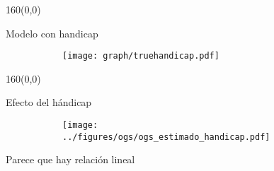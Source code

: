 \documentclass[shownotes,aspectratio=169]{beamer}
\begin{document}
\begin{frame}[plain]
\begin{textblock}{160}(0,0)
\begin{center}
 \Large Modelo con handicap
\end{center}
\end{textblock}

 \begin{figure}[H]     
     \centering
     \begin{subfigure}[b]{0.75\textwidth}
       \texttt{[image: graph/truehandicap.pdf]} 
     \end{subfigure}
   \end{figure} 
  
\end{frame}


% 
% 


\begin{frame}[plain]
\begin{textblock}{160}(0,0)
\begin{center}
 \Large Efecto del h\'andicap
\end{center}
\end{textblock}

   \begin{figure}[H]     
     \centering
     \begin{subfigure}[b]{0.75\textwidth}
       \texttt{[image: ../figures/ogs/ogs\_estimado\_handicap.pdf]} 
     \end{subfigure}
   \end{figure} 
   
   \pause
   
   \centering
   
   Parece que hay relación lineal

\end{frame}
\end{document}
